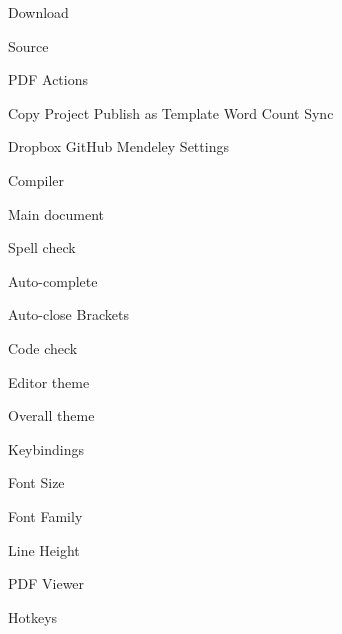 Download


Source

PDF
Actions

   Copy Project
   Publish as Template
   Word Count
Sync

   Dropbox
   GitHub
   Mendeley
Settings

Compiler

Main document

Spell check

Auto-complete

Auto-close Brackets

Code check

Editor theme

Overall theme

Keybindings

Font Size

Font Family

Line Height

PDF Viewer

Hotkeys

